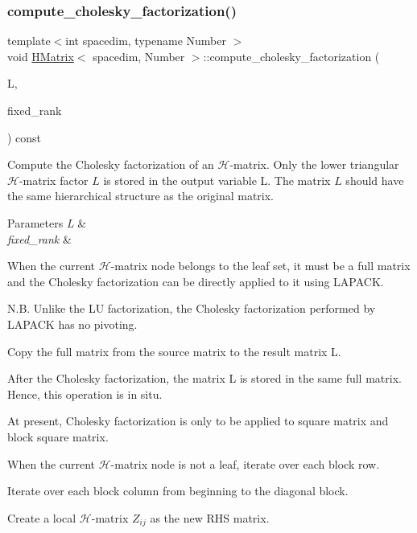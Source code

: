 \subsubsection{\texorpdfstring{compute\+\_\+cholesky\+\_\+factorization()}{compute\_cholesky\_factorization()}\hspace{0.1cm}{\footnotesize\ttfamily [1/2]}}
{\footnotesize\ttfamily template$<$int spacedim, typename Number $>$ \\
void \hyperlink{classHMatrix}{H\+Matrix}$<$ spacedim, Number $>$\+::compute\+\_\+cholesky\+\_\+factorization (\begin{DoxyParamCaption}\item[{\hyperlink{classHMatrix}{H\+Matrix}$<$ spacedim, Number $>$ \&}]{L,  }\item[{const unsigned int}]{fixed\+\_\+rank }\end{DoxyParamCaption}) const}

Compute the Cholesky factorization of an $\mathcal{H}$-\/matrix. Only the lower triangular $\mathcal{H}$-\/matrix factor $L$ is stored in the output variable {\ttfamily L}. The matrix $L$ should have the same hierarchical structure as the original matrix.


\begin{DoxyParams}{Parameters}
{\em L} & \\
\hline
{\em fixed\+\_\+rank} & \\
\hline
\end{DoxyParams}
When the current $\mathcal{H}$-\/matrix node belongs to the leaf set, it must be a full matrix and the Cholesky factorization can be directly applied to it using L\+A\+P\+A\+CK.

N.\+B. Unlike the LU factorization, the Cholesky factorization performed by L\+A\+P\+A\+CK has no pivoting.

Copy the full matrix from the source matrix to the result matrix {\ttfamily L}.

After the Cholesky factorization, the matrix {\ttfamily L} is stored in the same full matrix. Hence, this operation is in situ.

At present, Cholesky factorization is only to be applied to square matrix and block square matrix.

When the current $\mathcal{H}$-\/matrix node is not a leaf, iterate over each block row.

Iterate over each block column from beginning to the diagonal block.

Create a local $\mathcal{H}$-\/matrix $Z_{ij}$ as the new R\+HS matrix.


